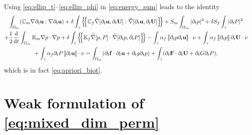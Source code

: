 \documentclass[a4paper]{m2an}
\numberwithin{equation}{section}
\def\agrad{\widetilde\nabla}
\def\avg#1{\left\{\mskip-5mu\left\{#1\right\}\mskip-5mu\right\}}
\def\CC{\tn C}
\def\ddt#1{\xdrv{#1}{t}}
\def\dt{\prtl_t}
\def\FF{\vc F}
\def\ff{\vc f}
\def\jmp#1{\left\llbracket #1 \right\rrbracket}
\def\nnu{\vc\nu}
\def\prtl{\partial}
\def\tn#1{{\mathbb{#1}}}    %
\def\U{\vc U}
\def\uu{\vc u}
\def\vc#1{\mathbf{#1}}     %
\newcommand{\mls}[1]{\begin{multline*}#1\end{multline*}}
\begin{document}
Using \eqref{eq:ellip_t}--\eqref{eq:ellip_phi} in \eqref{eq:energy_sum} leads to the identity
\mls{ \int_{\Omega_m}(\CC_m\nabla\dt\uu:\nabla\dt\uu ) + \delta\int_\gamma\avg{\CC_f\agrad[\dt\uu,\dt\U]:\agrad[\dt\uu,\dt\U]}
+ S_m\int_{\Omega_m}|\dt p|^2 + \delta S_f\int_\gamma|\dt P|^2\\
+ \frac12\ddt{}\int_{\Omega_m}\tn K_m\nabla p\cdot\nabla p
+ \delta\int_\gamma\avg{\tn K_f\agrad[p,P]\cdot\agrad[\dt p,\dt P]} 
- \int_\gamma\alpha_f\jmp{\dt p \dt\uu}\cdot\nnu
+ \int_\gamma\alpha_f\jmp{\dt p}\dt\U\cdot\nnu\\
+ \int_\gamma\alpha_f\dt P\jmp{\dt\uu}\cdot\nnu
= \int_{\Omega_m}(\dt\ff\cdot\dt\uu + \dt g \dt p) + \int_\gamma(\dt\FF\cdot\dt\U + \dt G \dt P), }
which is in fact \eqref{eq:apriori_biot}.



\section{Weak formulation of \eqref{eq:mixed_dim_perm}}\label{sec:app_weak_form}
\end{document}

